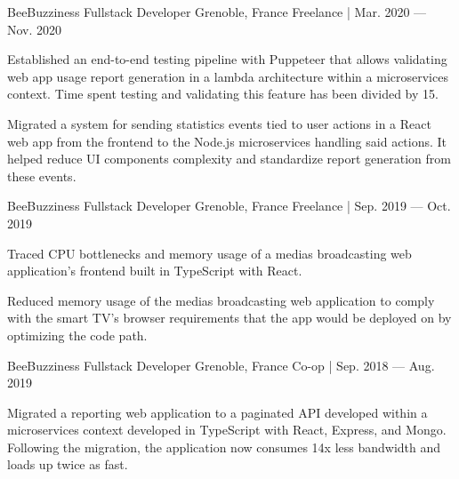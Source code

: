 

\begin{cventries}
    \cventry
    {BeeBuzziness} %
    {Fullstack Developer} %
    {Grenoble, France} %
    {Freelance | Mar. 2020 — Nov. 2020} %
    {
    \begin{cvitems} %
        \item {Established an end-to-end testing pipeline with Puppeteer that allows validating web app usage report generation in a lambda architecture within a microservices context.
        Time spent testing and validating this feature has been divided by 15.}
        \item {Migrated a system for sending statistics events tied to user actions in a React web app from the frontend to the Node.js microservices handling said actions.
        It helped reduce UI components complexity and standardize report generation from these events.}
    \end{cvitems}
    }

    \cventry
    {BeeBuzziness} %
    {Fullstack Developer} %
    {Grenoble, France} %
    {Freelance | Sep. 2019 — Oct. 2019} %
    {
    \begin{cvitems} %
        \item {Traced CPU bottlenecks and memory usage of a medias broadcasting web application's frontend built in TypeScript with React.}
        \item {Reduced memory usage of the medias broadcasting web application to comply with the smart TV's browser requirements that the app would be deployed on by optimizing the code path.}
    \end{cvitems}
    }

    \cventry
    {BeeBuzziness} %
    {Fullstack Developer} %
    {Grenoble, France} %
    {Co-op | Sep. 2018 — Aug. 2019} %
    {
    \begin{cvitems} %
        \item {Migrated a reporting web application to a paginated API developed within a microservices context developed in TypeScript with React, Express, and Mongo.
        Following the migration, the application now consumes 14x less bandwidth and loads up twice as fast.}
    \end{cvitems}
    }


\end{cventries}
